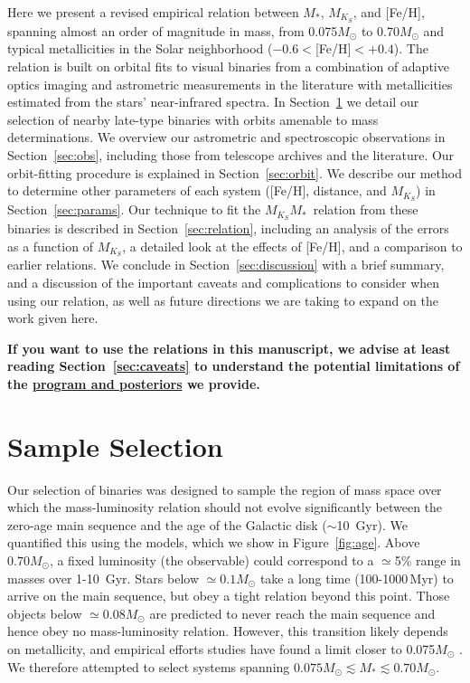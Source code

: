 \documentclass[twocolumn]{aastex62}
\newcommand{\mks}{$M_{K_S}$}
\newcommand{\mmk}{$M_{K_S}$\textendash$M_*$}
\begin{document}
Here we present a revised empirical relation between $M_*$, $M_{K_S}$, and [Fe/H], spanning almost an order of magnitude in mass, from 0.075$M_\odot$ to 0.70$M_\odot$ and typical metallicities in the Solar neighborhood ($-0.6<$[Fe/H]$<+0.4$). The relation is built on orbital fits to visual binaries from a combination of adaptive optics imaging and astrometric measurements in the literature with metallicities estimated from the stars' near-infrared spectra. In Section~\ref{sec:targets} we detail our selection of nearby late-type binaries with orbits amenable to mass determinations. We overview our astrometric and spectroscopic observations in Section~\ref{sec:obs}, including those from telescope archives and the literature. Our orbit-fitting procedure is explained in Section~\ref{sec:orbit}. We describe our method to determine other parameters of each system ([Fe/H], distance, and \mks) in Section~\ref{sec:params}. Our technique to fit the \mmk\ relation from these binaries is described in Section~\ref{sec:relation}, including an analysis of the errors as a function of \mks, a detailed look at the effects of [Fe/H], and a comparison to earlier relations. We conclude in Section~\ref{sec:discussion} with a brief summary, and a discussion of the important caveats and complications to consider when using our relation, as well as future directions we are taking to expand on the work given here.

 {\bf If you want to use the relations in this manuscript, we advise at least reading Section~\ref{sec:caveats} to understand the potential limitations of the \href{https://github.com/awmann/M_-M_K-}{program and posteriors} we provide.}%


\section{Sample Selection}\label{sec:targets}
Our selection of binaries was designed to sample the region of mass space over which the mass-luminosity relation should not evolve significantly between the zero-age main sequence and the age of the Galactic disk ($\sim$10~Gyr). We quantified this using the \citet{BHAC15} models, which we show in Figure~\ref{fig:age}. Above $0.70M_\odot$, a fixed luminosity (the observable) could correspond to a $\simeq$5\% range in masses over 1-10\, Gyr. Stars below $\simeq0.1M_\odot$ take a long time (100-1000\,Myr) to arrive on the main sequence, but obey a tight relation beyond this point. Those objects below $\simeq0.08M_\odot$ are predicted to never reach the main sequence and hence obey no mass-luminosity relation. However, this transition likely depends on metallicity, and empirical efforts studies have found a limit closer to 0.075$M_\odot$ \citep[e.g.,][]{Dieterich2014,Dupuy2017}. We therefore attempted to select systems spanning $0.075M_\odot \lesssim M_* \lesssim 0.70M_\odot$.
\end{document}
